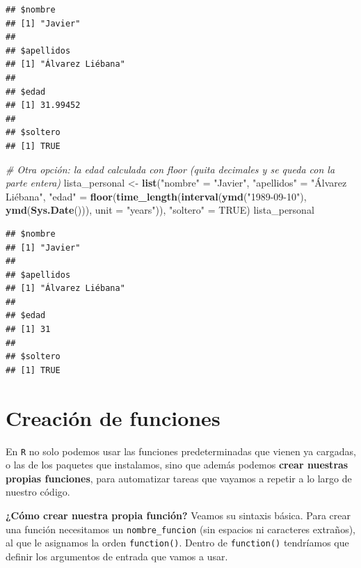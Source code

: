 \documentclass[11pt,]{book}
\newenvironment{Shaded}{\begin{snugshade}}{\end{snugshade}}
\newcommand{\CommentTok}[1]{\textcolor[rgb]{0.37,0.37,0.37}{\textit{#1}}}
\newcommand{\DataTypeTok}[1]{\textcolor[rgb]{0.27,0.27,0.27}{#1}}
\newcommand{\KeywordTok}[1]{\textcolor[rgb]{0.27,0.27,0.27}{\textbf{#1}}}
\newcommand{\NormalTok}[1]{#1}
\newcommand{\OtherTok}[1]{\textcolor[rgb]{0.37,0.37,0.37}{#1}}
\newcommand{\StringTok}[1]{\textcolor[rgb]{0.5,0.5,0.5}{#1}}
\begin{document}
\begin{verbatim}
## $nombre
## [1] "Javier"
## 
## $apellidos
## [1] "Álvarez Liébana"
## 
## $edad
## [1] 31.99452
## 
## $soltero
## [1] TRUE
\end{verbatim}

\begin{Shaded}
\begin{Highlighting}[]
\CommentTok{# Otra opción: la edad calculada con floor (quita decimales y se queda con la parte entera)}
\NormalTok{lista_personal <-}\StringTok{ }\KeywordTok{list}\NormalTok{(}\StringTok{"nombre"}\NormalTok{ =}\StringTok{ "Javier"}\NormalTok{,}
                       \StringTok{"apellidos"}\NormalTok{ =}\StringTok{ "Álvarez Liébana"}\NormalTok{,}
                       \StringTok{"edad"}\NormalTok{ =}\StringTok{ }\KeywordTok{floor}\NormalTok{(}\KeywordTok{time_length}\NormalTok{(}\KeywordTok{interval}\NormalTok{(}\KeywordTok{ymd}\NormalTok{(}\StringTok{"1989-09-10"}\NormalTok{), }\KeywordTok{ymd}\NormalTok{(}\KeywordTok{Sys.Date}\NormalTok{())), }\DataTypeTok{unit =} \StringTok{"years"}\NormalTok{)),}
                       \StringTok{"soltero"}\NormalTok{ =}\StringTok{ }\OtherTok{TRUE}\NormalTok{)}
\NormalTok{lista_personal}
\end{Highlighting}
\end{Shaded}

\begin{verbatim}
## $nombre
## [1] "Javier"
## 
## $apellidos
## [1] "Álvarez Liébana"
## 
## $edad
## [1] 31
## 
## $soltero
## [1] TRUE
\end{verbatim}

\hypertarget{FUNCIONES}{%
\chapter{Creación de funciones}\label{FUNCIONES}}

En \texttt{R} no solo podemos usar las funciones predeterminadas que vienen ya cargadas, o las de los paquetes que instalamos, sino que además podemos \textbf{crear nuestras propias funciones}, para automatizar tareas que vayamos a repetir a lo largo de nuestro código.

\textbf{¿Cómo crear nuestra propia función?} Veamos su sintaxis básica. Para crear una función necesitamos un \texttt{nombre\_funcion} (sin espacios ni caracteres extraños), al que le asignamos la orden \texttt{function()}. Dentro de \texttt{function()} tendríamos que definir los argumentos de entrada que vamos a usar.
\end{document}
